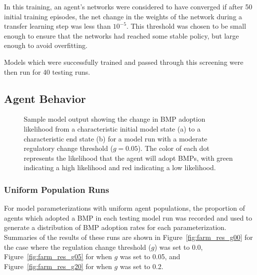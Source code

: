 In this training,
an agent's networks were considered to have converged if after 50
initial training episodes, 
the net change in the weights of the network during a transfer learning step
was less than $10^{-5}$.
This threshold was chosen to be small enough to ensure that the networks
had reached some stable policy, but large enough to avoid overfitting.

Models which were successfully trained and passed through this screening
were then run for 40 testing runs.

\subsection{Agent Behavior}
\label{subsec:farm_results_agents}

\begin{figure}
    \caption{Sample model output showing the change in BMP adoption likelihood
    from a characteristic initial model state (a) to a characteristic end state (b) for a model run with a moderate regulatory change threshold ($g=0.05$).
    The color of each dot represents the likelihood that the agent will adopt
    BMPs, with green indicating a high likelihood and red indicating a low
    likelihood.}
    \label{fig:farm_mas}
\end{figure}
\subsubsection{Uniform Population Runs}

For model parameterizations with uniform agent populations,
the proportion of agents which adopted a BMP in each testing model run
was recorded and used to generate a distribution of BMP adoption rates
for each parameterization.
Summaries of the results of these runs are shown
in Figure~\ref{fig:farm_res_g00} for the case where the regulation change
threshold ($g$) was set to 0.0,
Figure~\ref{fig:farm_res_g05} for when $g$ was set to 0.05, and 
Figure~\ref{fig:farm_res_g20} for when $g$ was set to 0.2.

